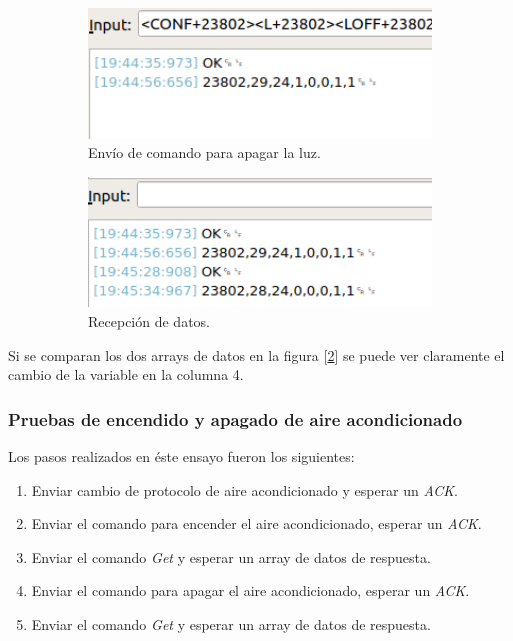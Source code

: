 \begin{figure}[h]

\begin{subfigure}{0.5\textwidth}
\includegraphics[width=1\textwidth]{./Figures/luz3.png}
\caption{Envío de comando para apagar la luz.}
\label{fig:luz3}
\end{subfigure}
\begin{subfigure}{0.5\textwidth}
\includegraphics[width=1\textwidth]{./Figures/luz4.png}
\caption{Recepción de datos.}
\label{fig:luz4}
\end{subfigure}

\caption{}
\label{fig:image4}
\end{figure}

Si se comparan los dos arrays de datos en la figura [\ref{fig:luz4}] se puede ver claramente el cambio de la variable en la columna 4.

\subsubsection{Pruebas de encendido y apagado de aire acondicionado}

Los pasos realizados en éste ensayo fueron los siguientes:

\begin{enumerate}
\item Enviar cambio de protocolo de aire acondicionado y esperar un {\textit{ACK}}.
\item Enviar el comando para encender el aire acondicionado, esperar un {\textit{ACK}}.
\item Enviar el comando {\textit{Get}} y esperar un array de datos de respuesta.
\item Enviar el comando para apagar el aire acondicionado, esperar un {\textit{ACK}}.
\item Enviar el comando {\textit{Get}} y esperar un array de datos de respuesta.
\end{enumerate}

